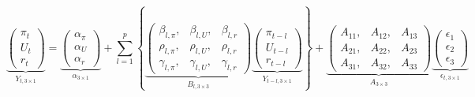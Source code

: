             \begin{equation}
                \underbrace{
                \begin{pmatrix}
                    \pi_t\\
                    U_t\\
                    r_t
                \end{pmatrix}}_{Y_{t,3\times 1}}
                =
                \underbrace{
                \begin{pmatrix}
                    \alpha_{\pi}\\
                    \alpha_{U}\\
                    \alpha_{r}
                \end{pmatrix}}_{\alpha_{3\times 1}}
                +
                \sum_{l=1}^p \left\{
                \underbrace{
                \begin{pmatrix}
                    \beta_{l,\pi}, & \beta_{l,U}, & \beta_{l,r}\\
                    \rho_{l,\pi}, & \rho_{l,U}, & \rho_{l,r}\\
                    \gamma_{l,\pi}, & \gamma_{l,U}, & \gamma_{l,r}
                \end{pmatrix}
                }_{B_{l,3\times 3}}
                \underbrace{
                \begin{pmatrix}
                    \pi_{t-l}\\
                    U_{t-l}\\
                    r_{t-l}
                \end{pmatrix}}_{Y_{t-l,3\times 1}}
                \right\}
                +
                \underbrace{
                \begin{pmatrix}
                    A_{11}, & A_{12}, & A_{13}\\
                    A_{21}, & A_{22}, & A_{23}\\
                    A_{31}, & A_{32}, & A_{33}
                \end{pmatrix}
                }_{A_{3\times 3}}
                \underbrace{
                \begin{pmatrix}
                    \epsilon_1\\
                    \epsilon_2\\
                    \epsilon_3
                \end{pmatrix}}_{\epsilon_{t,3\times 1}}
                \label{eqn:SVAR}
                \tag{SVAR}
            \end{equation}
            
